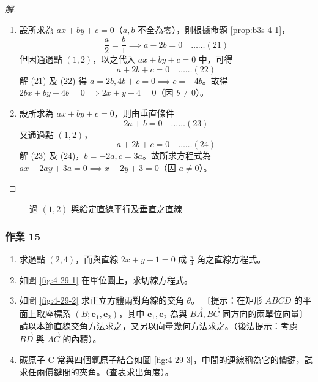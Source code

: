 \begin{proof}[解]
\begin{enumerate}[label=(\roman*), leftmargin=2em]
  \item 設所求為 $ax + by + c = 0$（$a, b$ 不全為零），則根據命題 \ref{prop:b3s-4-1}，
  \[ \frac{a}{2} = \frac{b}{1} \implies a - 2b = 0 \quad\dots\dots (21) \]
  但因通過點 $(1, 2)$，以之代入 $ax + by + c = 0$ 中，可得
  \[ a + 2b + c = 0 \quad\dots\dots (22) \]
  解 (21) 及 (22) 得 $a = 2b, 4b + c = 0 \implies c = -4b$。故得 $2bx + by - 4b = 0 \implies 2x + y - 4 = 0$（因 $b \neq 0$）。
  
  \item 設所求為 $ax + by + c = 0$，則由垂直條件
  \[ 2a + b = 0 \quad\dots\dots (23) \]
  又通過點 $(1, 2)$，
  \[ a + 2b + c = 0 \quad\dots\dots (24) \]
  解 (23) 及 (24)，$b = -2a, c = 3a$。故所求方程式為 $ax - 2ay + 3a = 0 \implies x - 2y + 3 = 0$（因 $a \neq 0$）。
\end{enumerate}
\end{proof}

\begin{figure}[H]
\centering
{}
\caption{過 $(1,2)$ 與給定直線平行及垂直之直線}
\label{fig:4-28}
\end{figure}

\subsubsection*{作業 15}
\begin{enumerate}[label=(\roman*), leftmargin=2em]
  \item 求過點 $(2, 4)$，而與直線 $2x + y - 1 = 0$ 成 $\frac{\pi}{4}$ 角之直線方程式。
  \item 如圖 \ref{fig:4-29-1} 在單位圓上，求切線方程式。
  \item 如圖 \ref{fig:4-29-2} 求正立方體兩對角線的交角 $\theta$。
  〔提示：在矩形 $ABCD$ 的平面上取座標系 $(B; \mathbf{e}_1, \mathbf{e}_2)$，其中 $\mathbf{e}_1, \mathbf{e}_2$ 為與 $\vec{BA}, \vec{BC}$ 同方向的兩單位向量〕請以本節直線交角方法求之，又另以向量幾何方法求之。（後法提示：考慮 $\vec{BD}$ 與 $\vec{AC}$ 的內積）。
  \item 碳原子 C 常與四個氫原子結合如圖 \ref{fig:4-29-3}，中間的連線稱為它的價鍵，試求任兩價鍵間的夾角。（查表求出角度）。
\end{enumerate}

